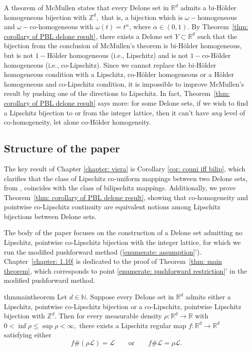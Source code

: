 \documentclass{article}
\newcommand{\R}{\mathbb{R}}
\newcommand{\Z}{\mathbb{Z}}
\newcommand{\N}{\mathbb{N}}
\newcommand{\leb}{\mc{L}}
\newcommand{\mc}[1]{\mathcal{#1}}
\begin{document}
A theorem of McMullen \cite[Theorem $5.1(3)$]{mcmullen1998lipschitz} states that every Delone set in $\R^d$ admits a bi-H\"{o}lder homogeneous bijection with $\Z^d,$ that is, a bijection which is $\omega-$homogeneous and $\omega-$co-homogeneous with $\omega(t) = t^\alpha$, where $\alpha \in (0,1)$.
 By Theorem~\ref{thm: corollary of PBL delone result}, there exists a Delone set $Y \subset \R^d$ such that the bijection from the conclusion of McMullen's theorem is bi-H\"{o}lder homogeneous, but is not $1-$H\"{o}lder homogeneous (i.e., Lipschitz) and is not $1-$co-H\"{o}lder homogeneous (i.e., co-Lipschitz). Since we cannot replace the bi-H\"{o}lder homogeneous condition with a Lipschitz, co-H\"{o}lder homogeneous or a H\"{o}lder homogeneous and co-Lipschitz condition, it is impossible to improve McMullen's result by pushing one of the directions to Lipschitz.  In fact, Theorem~\ref{thm: corollary of PBL delone result} says more: for some Delone sets, if we wish to find a Lipschitz bijection to or from the integer lattice, then it can't have \emph{any} level of co-homogeneity, let alone co-H\"{o}lder homogeneity.
 
\subsection{Structure of the paper}
The key result of Chapter \ref{chapter: viera} is Corollary \ref{cor: couni iff bilip}, which clarifies that the class of Lipschitz co-uniform mappings between two Delone sets, from \cite{viera2023delone}, coincides with the class of bilipschitz mappings. Additionally, we prove Theorem~\ref{thm: corollary of PBL delone result}, showing that co-homogeneity and pointwise co-Lipschitz continuity are equivalent notions among Lipschitz bijections between Delone sets.

The body of the paper focuses on the construction of a Delone set admitting no Lipschitz, pointwise co-Lipschitz bijection with the integer lattice, for which we run the modified pushforward method (\ref{enumerate: assumption}').
Chapter~\ref{chapter: 1.10} is dedicated to the proof of Theorem~\ref{thm: main theorem}, which corresponds to point \ref{enumerate: pushforward restriction}' in the modified pushforward method.
\begin{restatable}{thm}{maintheorem} \label{thm: main theorem}
    Let $d \in \N$. Suppose every Delone set in $\R^d$ admits either a Lipschitz, pointwise co-Lipschitz bijection or a co-Lipschitz, pointwise Lipschitz bijection with $\Z^d$. Then for every measurable density $\rho:\R^d \to \R$ with $0< \inf \rho \leq \sup \rho < \infty,$ there exists a Lipschitz regular map $f:\R^d \to \R^d$ satisfying either 
    \begin{equation*} \label{eq: pushforward equation}
        f\#(\rho\mathcal{L}) = \mathcal{L} \qquad \text{or} \qquad  f\#\leb = \rho\leb. \end{equation*}
\end{restatable}
\end{document}
